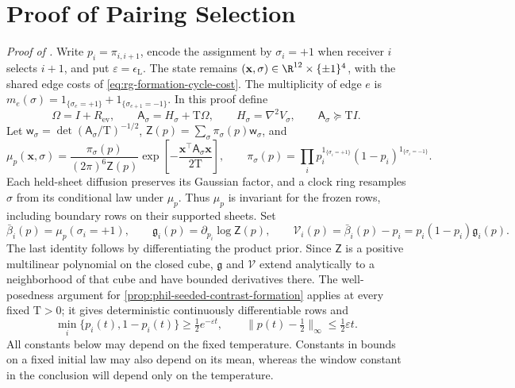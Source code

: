\section{Proof of Pairing Selection}
\label{sec:phil-pairing-selection-proof}

\noindent\emph{Proof of .}
Write \(p_i=\pi_{i,i+1}\), encode the assignment by
\(\sigma_i=+1\) when receiver \(i\) selects \(i+1\), and put
\(\varepsilon=\epsilon_{\mathrm L}\). The state remains
\((\mathbf x,\sigma)\in\R^{12}\times\{\pm1\}^4\), with the shared edge
costs of \cref{eq:rg-formation-cycle-cost}. The multiplicity of edge
\(e\) is
\(m_e(\sigma)=1_{\{\sigma_e=+1\}}+1_{\{\sigma_{e+1}=-1\}}\).
In this proof define
\[
 \Omega=I+R_{\mathrm{ev}},\qquad
 \mathsf A_\sigma=H_\sigma+\mathrm T\Omega,\qquad
 H_\sigma=\nabla^2V_\sigma,\qquad
 \mathsf A_\sigma\succeq\mathrm TI.
\]
Let \(\mathsf w_\sigma=\det(\mathsf A_\sigma/\mathrm T)^{-1/2}\),
\(\mathsf Z(p)=\sum_\sigma\pi_\sigma(p)\mathsf w_\sigma\), and
\[
 \mu_p(\mathbf x,\sigma)
 =\frac{\pi_\sigma(p)}{(2\pi)^6\mathsf Z(p)}
   \exp\left[-\frac{\mathbf x^\top\mathsf A_\sigma\mathbf x}
                    {2\mathrm T}\right],\qquad
 \pi_\sigma(p)=\prod_i p_i^{1_{\{\sigma_i=+1\}}}
                         (1-p_i)^{1_{\{\sigma_i=-1\}}}.
\]
Each held-sheet diffusion preserves its Gaussian factor, and a clock ring
resamples \(\sigma\) from its conditional law under \(\mu_p\). Thus
\(\mu_p\) is invariant for the frozen rows, including boundary rows on their
supported sheets. Set
\begin{equation}
 \bar\beta_i(p)=\mu_p(\sigma_i=+1),\qquad
 \mathfrak g_i(p)=\partial_{p_i}\log\mathsf Z(p),\qquad
 \mathscr V_i(p)=\bar\beta_i(p)-p_i
               =p_i(1-p_i)\mathfrak g_i(p).
\label{eq:phil-selection-reduced-field}
\end{equation}
The last identity follows by differentiating the product prior. Since
\(\mathsf Z\) is a positive multilinear polynomial on the closed cube,
\(\mathfrak g\) and \(\mathscr V\) extend analytically to a neighborhood of
that cube and have bounded derivatives there. The well-posedness argument
for \cref{prop:phil-seeded-contrast-formation} applies at every fixed
\(\mathrm T>0\); it gives deterministic continuously differentiable rows and
\begin{equation}
 \min_i\{p_i(t),1-p_i(t)\}\ge\tfrac12e^{-\varepsilon t},\qquad
 \|p(t)-\tfrac12\|_\infty\le\tfrac12\varepsilon t.
\label{eq:phil-selection-row-bounds}
\end{equation}
All constants below may depend on the fixed temperature. Constants in
bounds on a fixed initial law may also depend on its mean, whereas the
window constant in the conclusion will depend only on the temperature.

